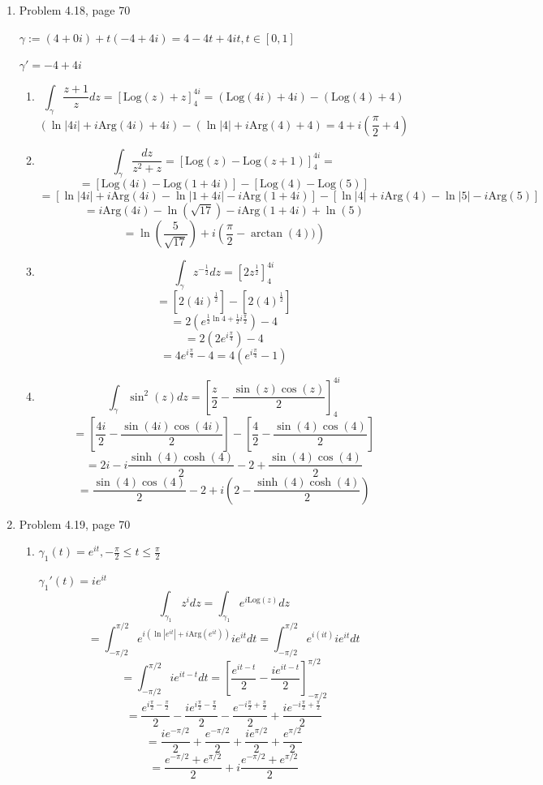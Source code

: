 \documentclass{article}
\newcommand{\Log}{\text{Log}}
\newcommand{\Arg}{\text{Arg}}
\begin{document}
\begin{enumerate}
	\item Problem 4.18, page 70
	
	$\gamma := (4+0i)+t(-4+4i)=4-4t+4it, t\in [0,1]$
		
	$\gamma '=-4+4i$
	\begin{enumerate}
		\item
		\[\int_{\gamma}\frac{z+1}{z}dz=[\Log(z)+z]_{4}^{4i}=(\Log(4i)+4i)-(\Log(4)+4) \]
		\[(\ln|4i|+i\Arg(4i)+4i)-(\ln|4|+i\Arg(4)+4)=4+i\left(\frac{\pi}{2}+4\right) \]
		
		\item
		\[\int_{\gamma}\frac{dz}{z^2+z}=[\Log(z)-\Log(z+1)]_{4}^{4i} = \]
		\[=[\Log(4i)-\Log(1+4i)]-[\Log(4)-\Log(5)] \]
		\[=[\ln|4i|+i\Arg(4i)-\ln|1+4i|-i\Arg(1+4i)] - [\ln|4|+i\Arg(4)-\ln|5|-i\Arg(5)] \]
		\[=i\Arg(4i)-\ln(\sqrt{17})-i\Arg(1+4i)+\ln(5) \]
		\[=\ln\left(\frac{5}{\sqrt{17}}\right)+i\left(\frac{\pi}{2}-\arctan(4)) \right) \]
		
		\item 
		\[\int_{\gamma}z^{-\frac{1}{2}}dz=\left[2z^{\frac{1}{2}} \right]_{4}^{4i} \]
		\[=\left[ 2(4i)^{\frac{1}{2}}   \right]-\left[ 2(4)^{\frac{1}{2}}  \right] \]
		\[ =2(e^{\frac{1}{2}\ln4+\frac{1}{2}i\frac{\pi}{2}})- 4 \]
		\[=2(2e^{i\frac{\pi}{4}} )-4\]
		\[=4e^{i\frac{\pi}{4}}-4=4(e^{i\frac{\pi}{4}}-1) \]
		
		\item 
		\[\int_{\gamma}\sin^2(z)dz=\left[ \frac{z}{2}-\frac{\sin(z)\cos(z)}{2}  \right]_{4}^{4i} \]
		\[=\left[ \frac{4i}{2}-\frac{\sin(4i)\cos(4i)}{2}  \right] -\left[ \frac{4}{2}-\frac{\sin(4)\cos(4)}{2}  \right]\]
		\[=2i-i\frac{\sinh(4)\cosh(4)}{2}-2+\frac{\sin(4)\cos(4)}{2} \]
		\[=\frac{\sin(4)\cos(4)}{2}-2+i\left(2-\frac{\sinh(4)\cosh(4)}{2}\right) \]
	\end{enumerate}
	
	\item Problem 4.19, page 70
	\begin{enumerate}
		\item $\gamma_1(t)=e^{it}, -\frac{\pi}{2}\leq t \leq \frac{\pi}{2}$
		
		$\gamma_1 '(t)=ie^{it}$
		\[\int_{\gamma_1}z^i dz = \int_{\gamma_1}e^{i\Log(z)}dz \]
		\[=\int_{-\pi/2}^{\pi/2}e^{i(\ln|e^{it}|+i\Arg(e^{it}))}ie^{it}dt= \int_{-\pi/2}^{\pi/2}e^{i(it)}ie^{it}dt\]
		\[=\int_{-\pi/2}^{\pi/2}ie^{it-t}dt=\left[\frac{e^{it-t}}{2}-\frac{ie^{it-t}}{2} \right]_{-\pi/2}^{\pi/2} \]
		\[=\frac{e^{i\frac{\pi}{2}-\frac{\pi}{2}}}{2} - \frac{ie^{i\frac{\pi}{2}-\frac{\pi}{2}}}{2} - \frac{e^{-i\frac{\pi}{2}+\frac{\pi}{2}}}{2} + \frac{ie^{-i\frac{\pi}{2}+\frac{\pi}{2}}}{2} \]
		\[=\frac{ie^{-\pi/2}}{2} + \frac{e^{-\pi/2}}{2} + \frac{ie^{\pi/2}}{2} + \frac{e^{\pi/2}}{2} \]
		\[=\frac{e^{-\pi/2}+e^{\pi/2}}{2}  + i\frac{e^{-\pi/2}+e^{\pi/2}}{2}\]
		

\end{enumerate}
\end{enumerate}
\end{document}
